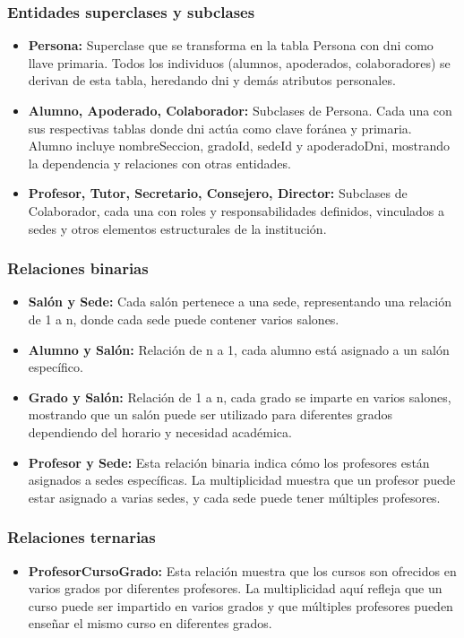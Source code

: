 \subsubsection{Entidades superclases y subclases}
\begin{itemize}
	\item \textbf{Persona:} Superclase que se transforma en la tabla Persona con dni como llave primaria. Todos los individuos (alumnos, apoderados, colaboradores) se derivan de esta tabla, heredando dni y demás atributos personales.
	\item \textbf{Alumno, Apoderado, Colaborador:} Subclases de Persona. Cada una con sus respectivas tablas donde dni actúa como clave foránea y primaria. Alumno incluye nombreSeccion, gradoId, sedeId y apoderadoDni, mostrando la dependencia y relaciones con otras entidades.
	\item \textbf{Profesor, Tutor, Secretario, Consejero, Director:} Subclases de Colaborador, cada una con roles y responsabilidades definidos, vinculados a sedes y otros elementos estructurales de la institución.
\end{itemize}
\subsubsection{Relaciones binarias}
\begin{itemize}
	\item \textbf{Salón y Sede:} Cada salón pertenece a una sede, representando una relación de 1 a n, donde cada sede puede contener varios salones.
	\item \textbf{Alumno y Salón:} Relación de n a 1, cada alumno está asignado a un salón específico.
	\item \textbf{Grado y Salón:} Relación de 1 a n, cada grado se imparte en varios salones, mostrando que un salón puede ser utilizado para diferentes grados dependiendo del horario y necesidad académica.
	\item \textbf{Profesor y Sede:} Esta relación binaria indica cómo los profesores están asignados a sedes específicas. La multiplicidad muestra que un profesor puede estar asignado a varias sedes, y cada sede puede tener múltiples profesores.
\end{itemize}
\subsubsection{Relaciones ternarias}
\begin{itemize}
	\item \textbf{ProfesorCursoGrado:} Esta relación muestra que los cursos son ofrecidos en varios grados por diferentes profesores. La multiplicidad aquí refleja que un curso puede ser impartido en varios grados y que múltiples profesores pueden enseñar el mismo curso en diferentes grados.
\end{itemize}
